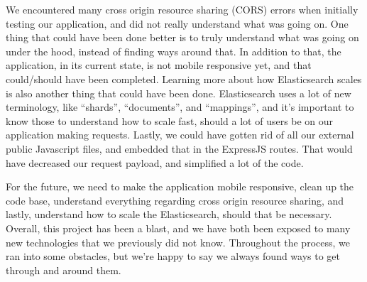 \par We encountered many  cross origin resource sharing (CORS) errors when initially testing our application, and did not really understand what was going on. One thing that could have been done better is to truly understand what was going on under the hood, instead of finding ways around that. In addition to that, the application, in its current state, is not mobile responsive yet, and that could/should have been completed. Learning more about how Elasticsearch scales is also another thing that could have been done. Elasticsearch uses a lot of new terminology, like “shards”, “documents”, and “mappings”, and it's important to know those to understand how to scale fast, should a lot of users be on our application making requests. Lastly, we could have gotten rid of all our external public Javascript files, and embedded that in the ExpressJS routes. That would have decreased our request payload, and simplified a lot of the code. 

\par For the future, we need to make the application mobile responsive, clean up the code base, understand everything regarding cross origin resource sharing, and lastly, understand how to scale the Elasticsearch, should that be necessary. Overall, this project has been a blast, and we have both been exposed to many new technologies that we previously did not know. Throughout the process, we ran into some obstacles, but we’re happy to say we always found ways to get through and around them. 